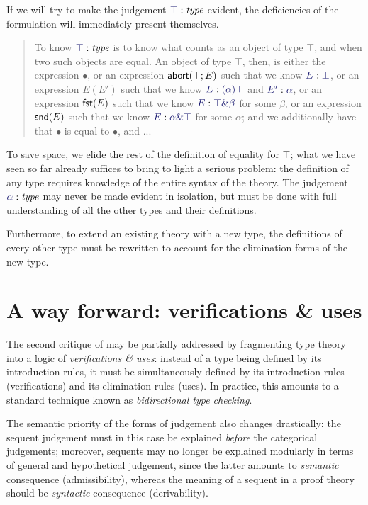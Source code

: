 If we will try to make the judgement $\type\top$ evident, the deficiencies of
the formulation will immediately present themselves.

\begin{quote}
To know $\type\top$ is to know what counts as an object of type $\top$, and when
two such objects are equal. An object of type $\top$, then, is either the
expression $\bullet$, or an expression $\mathsf{abort}(\top;E)$ such that we know
$\ofty{E}{\bot}$, or an expression $E(E')$ such that we know $\ofty{E}{(\alpha)\top}$ and
$\ofty{E'}{\alpha}$, or an expression $\mathsf{fst}(E)$ such that we know $\ofty{E}{\product\top\beta}$
for some $\beta$, or an expression $\mathsf{snd}(E)$ such that we know
$\ofty{E}{\product\alpha\top}$ for some $\alpha$; and we additionally have that $\bullet$
is equal to $\bullet$, and ...
\end{quote}

To save space, we elide the rest of the definition of equality for $\top$; what
we have seen so far already suffices to bring to light a serious problem: the
definition of any type requires knowledge of the entire syntax of the theory.
The judgement $\type\alpha$ may never be made evident in isolation, but must be
done with full understanding of all the other types and their definitions.

Furthermore, to extend an existing theory with a new type, the definitions of
every other type must be rewritten to account for the elimination forms of the
new type.

\section{A way forward: verifications \& uses}

The second critique of \MLLF{} may be partially addressed by fragmenting type
theory into a logic of \emph{verifications \& uses}: instead of a type being
defined by its introduction rules, it must be simultaneously defined by its
introduction rules (verifications) and its elimination rules (uses). In
practice, this amounts to a standard technique known as \emph{bidirectional
type checking}.

The semantic priority of the forms of judgement also changes drastically: the
sequent judgement must in this case be explained \emph{before} the categorical
judgements; moreover, sequents may no longer be explained modularly in terms of
general and hypothetical judgement, since the latter amounts to
\emph{semantic} consequence (admissibility), whereas the meaning of a sequent
in a proof theory should be \emph{syntactic} consequence (derivability).

